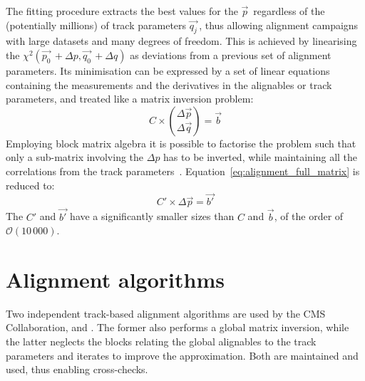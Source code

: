 The fitting procedure extracts the best values for the $\vec{p}\,$ regardless of the (potentially millions) of track parameters $\vec{q_j}\,$,
thus allowing alignment campaigns with large datasets and many degrees of freedom.
This is achieved by linearising the $\chi^2(\vec{p_0}\,+\Delta p, \vec{q_0}\,+\Delta q)$ as deviations from a previous set of alignment parameters.
Its minimisation can be expressed by a set of linear equations containing the measurements and the derivatives in the alignables or track parameters,
and treated like a matrix inversion problem:
\begin{equation}
  \label{eq:alignment_full_matrix}
  C \times \binom{\Delta\vec{p}}{\Delta\vec{q}} = \vec{b}
\end{equation}
Employing block matrix algebra it is possible to factorise the problem such that only a sub-matrix involving the $\Delta p$ has to be inverted,
while maintaining all the correlations from the track parameters~\cite{blobel2002new}.
Equation~\ref{eq:alignment_full_matrix} is reduced to:
\begin{equation}
  \label{eq:alignment_reduced_matrix}
  C' \times \Delta\vec{p} = \vec{b'}
\end{equation}
The $C'$ and $\vec{b'}$ have a significantly smaller sizes than $C$ and $\vec{b}$,
of the order of $\mathcal{O}(10\,000)$.

\section{Alignment algorithms}
Two independent track-based alignment algorithms are used by the CMS Collaboration, \MPII and \HIPPY.
The former also performs a global matrix inversion, while the latter neglects the blocks
relating the global alignables to the track parameters and iterates to improve the approximation.
Both are maintained and used, thus enabling cross-checks.

